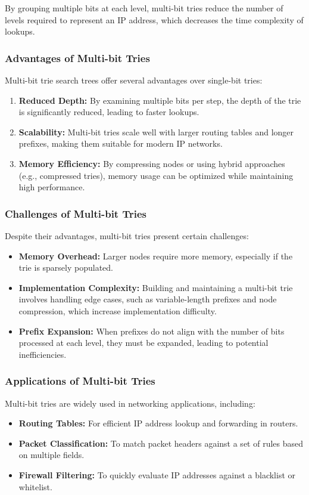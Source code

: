 \documentclass[12pt	]{article}
\begin{document}
By grouping multiple bits at each level, multi-bit tries reduce the number of levels required to represent an IP address, which decreases the time complexity of lookups.

\subsubsection{Advantages of Multi-bit Tries}
Multi-bit trie search trees offer several advantages over single-bit tries:
\begin{enumerate}
	\item \textbf{Reduced Depth:} By examining multiple bits per step, the depth of the trie is significantly reduced, leading to faster lookups.
	\item \textbf{Scalability:} Multi-bit tries scale well with larger routing tables and longer prefixes, making them suitable for modern IP networks.
	\item \textbf{Memory Efficiency:} By compressing nodes or using hybrid approaches (e.g., compressed tries), memory usage can be optimized while maintaining high performance.
\end{enumerate}

\subsubsection{Challenges of Multi-bit Tries}
Despite their advantages, multi-bit tries present certain challenges:
\begin{itemize}
	\item \textbf{Memory Overhead:} Larger nodes require more memory, especially if the trie is sparsely populated.
	\item \textbf{Implementation Complexity:} Building and maintaining a multi-bit trie involves handling edge cases, such as variable-length prefixes and node compression, which increase implementation difficulty.
	\item \textbf{Prefix Expansion:} When prefixes do not align with the number of bits processed at each level, they must be expanded, leading to potential inefficiencies.
\end{itemize}

\subsubsection{Applications of Multi-bit Tries}
Multi-bit tries are widely used in networking applications, including:
\begin{itemize}
	\item \textbf{Routing Tables:} For efficient IP address lookup and forwarding in routers.
	\item \textbf{Packet Classification:} To match packet headers against a set of rules based on multiple fields.
	\item \textbf{Firewall Filtering:} To quickly evaluate IP addresses against a blacklist or whitelist.
\end{itemize}
\end{document}
